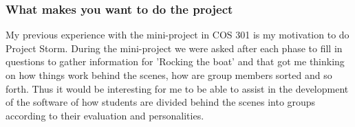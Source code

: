 \documentclass[hidelinks, 12pt, oneside]{article}
\begin{document}
\subsubsection{What makes you want to do the project}
My previous experience with the mini-project in COS 301 is my motivation to do Project Storm. During the mini-project we were asked after each phase to fill in questions to gather information for 'Rocking the boat' and that got me thinking on how things work behind the scenes, how are group members sorted and so forth. Thus it would be interesting for me to be able to assist in the development of the software of how students are divided behind the scenes into groups according to their evaluation and personalities. 
\end{document}
